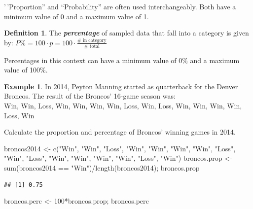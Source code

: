 \documentclass[
]{book}
\newenvironment{Shaded}{\begin{snugshade}}{\end{snugshade}}
\newcommand{\DecValTok}[1]{\textcolor[rgb]{0.00,0.00,0.81}{#1}}
\newcommand{\FunctionTok}[1]{\textcolor[rgb]{0.00,0.00,0.00}{#1}}
\newcommand{\NormalTok}[1]{#1}
\newcommand{\OtherTok}[1]{\textcolor[rgb]{0.56,0.35,0.01}{#1}}
\newcommand{\SpecialCharTok}[1]{\textcolor[rgb]{0.00,0.00,0.00}{#1}}
\newcommand{\StringTok}[1]{\textcolor[rgb]{0.31,0.60,0.02}{#1}}
\theoremstyle{definition}
\newtheorem{definition}{Definition}[chapter]
\theoremstyle{definition}
\newtheorem{example}{Example}[chapter]
\theoremstyle{definition}
\theoremstyle{definition}
\theoremstyle{remark}
\begin{document}
'\,'Proportion'' and ``Probability'' are often used interchangeably. Both have a minimum value of 0 and a maximum value of 1.

\begin{definition}
The \textbf{\emph{percentage}} of sampled data that fall into a category is given by: \(P\% = 100 \cdot p = 100 \cdot \frac{\#\text{ in category}}{\#\text{ total}}\)
\end{definition}

Percentages in this context can have a minimum value of 0\% and a maximum value of 100\%.

\begin{example}
In 2014, Peyton Manning started as quarterback for the Denver Broncos. The result of the Broncos' 16-game season was:\\
Win, Win, Loss, Win, Win, Win, Win, Loss, Win, Loss, Win, Win, Win, Win, Loss, Win

Calculate the proportion and percentage of Broncos' winning games in 2014.
\end{example}

\hfill\break
\hfill\break
\hfill\break
\hfill\break
\hfill\break

\begin{Shaded}
\begin{Highlighting}[]
\NormalTok{broncos2014 }\OtherTok{\textless{}{-}} \FunctionTok{c}\NormalTok{(}\StringTok{"Win"}\NormalTok{, }\StringTok{"Win"}\NormalTok{, }\StringTok{"Loss"}\NormalTok{, }\StringTok{"Win"}\NormalTok{, }\StringTok{"Win"}\NormalTok{, }\StringTok{"Win"}\NormalTok{, }\StringTok{"Win"}\NormalTok{, }\StringTok{"Loss"}\NormalTok{, }\StringTok{"Win"}\NormalTok{, }\StringTok{"Loss"}\NormalTok{, }\StringTok{"Win"}\NormalTok{, }\StringTok{"Win"}\NormalTok{, }\StringTok{"Win"}\NormalTok{, }\StringTok{"Win"}\NormalTok{, }\StringTok{"Loss"}\NormalTok{, }\StringTok{"Win"}\NormalTok{)}
\NormalTok{broncos.prop }\OtherTok{\textless{}{-}} \FunctionTok{sum}\NormalTok{(broncos2014 }\SpecialCharTok{==} \StringTok{"Win"}\NormalTok{)}\SpecialCharTok{/}\FunctionTok{length}\NormalTok{(broncos2014); broncos.prop}
\end{Highlighting}
\end{Shaded}

\begin{verbatim}
## [1] 0.75
\end{verbatim}

\begin{Shaded}
\begin{Highlighting}[]
\NormalTok{broncos.perc }\OtherTok{\textless{}{-}} \DecValTok{100}\SpecialCharTok{*}\NormalTok{broncos.prop; broncos.perc}
\end{Highlighting}
\end{Shaded}
\end{document}
